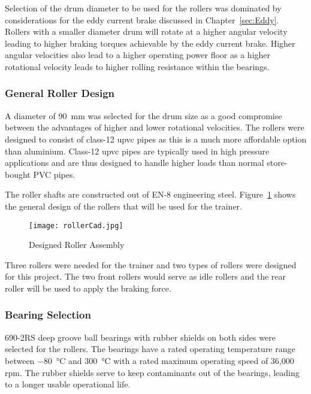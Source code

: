 \vspace*{-0.5cm}	

Selection of the drum diameter to be used for the rollers was dominated by considerations for the eddy current brake discussed in Chapter~\ref{sec:Eddy}. Rollers with a smaller diameter drum will rotate at a higher angular velocity leading to higher braking torques achievable by the eddy current brake. Higher angular velocities also lead to a higher operating power floor as a higher rotational velocity leads to higher rolling resistance within the bearings.

\subsubsection{General Roller Design}

A diameter of \SI{90}{\milli\meter} was selected for the drum size as a good compromise between the advantages of higher and lower rotational velocities. The rollers were designed to consist of class-12 \acf{upvc} pipes as this is a much more affordable option than aluminium. Class-12 \ac{upvc} pipes are typically used in high pressure applications and are thus designed to handle higher loads than normal store-bought PVC pipes. 

The roller shafts are constructed out of EN-8 engineering steel. Figure~\ref{fig:rollerGen} shows the general design of the rollers that will be used for the trainer.

\begin{figure}[H]
	\centering
	\texttt{[image: rollerCad.jpg]}
	\caption{Designed Roller Assembly}
	\label{fig:rollerGen}
\end{figure}

Three rollers were needed for the trainer and two types of rollers were designed for this project. The two front rollers would serve as idle rollers and the rear roller will be used to apply the braking force. 

\subsubsection{Bearing Selection}

690-2RS deep groove ball bearings with rubber shields on both sides were selected for the rollers. The bearings have a rated operating temperature range between \SI{-80}{\degreeCelsius} and \SI{300}{\degreeCelsius} with a rated maximum operating speed of 36,000 \ac{rpm}. The rubber shields serve to keep contaminants out of the bearings, leading to a longer usable operational life. 

